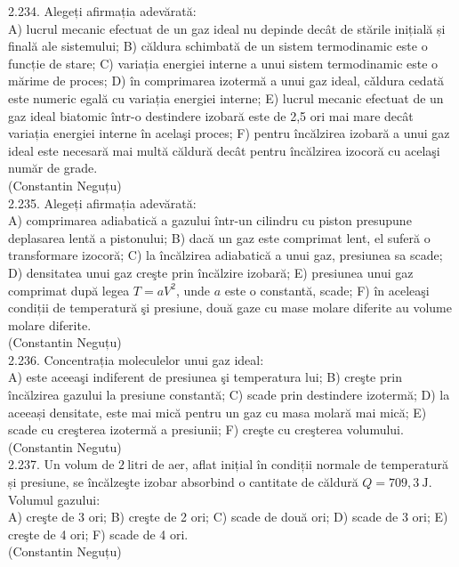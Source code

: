 \documentclass[10pt]{article}
\begin{document}
2.234. Alegeți afirmația adevărată:\\ A) lucrul mecanic efectuat de un gaz ideal nu depinde decât de stările inițială și finală ale sistemului; B) căldura schimbată de un sistem termodinamic este o funcție de stare; C) variația energiei interne a unui sistem termodinamic este o mărime de proces; D) în comprimarea izotermă a unui gaz ideal, cǎldura cedată este numeric egală cu variația energiei interne; E) lucrul mecanic efectuat de un gaz ideal biatomic într-o destindere izobară este de 2,5 ori mai mare decât variația energiei interne în acelaşi proces; F) pentru încălzirea izobară a unui gaz ideal este necesară mai multă căldură decât pentru încălzirea izocoră cu acelaşi număr de grade.\\ (Constantin Neguțu)\\

2.235. Alegeți afirmația adevărată:\\ A) comprimarea adiabatică a gazului într-un cilindru cu piston presupune deplasarea lentă a pistonului; B) dacă un gaz este comprimat lent, el suferă o transformare izocoră; C) la încălzirea adiabatică a unui gaz, presiunea sa scade; D) densitatea unui gaz creşte prin încălzire izobară; E) presiunea unui gaz comprimat după legea $T=a V^{2}$, unde $a$ este o constantă, scade; F) în aceleaşi condiții de temperatură şi presiune, două gaze cu mase molare diferite au volume molare diferite.\\ (Constantin Neguțu)\\

2.236. Concentrația moleculelor unui gaz ideal:\\ A) este aceeaşi indiferent de presiunea şi temperatura lui; B) creşte prin încălzirea gazului la presiune constantă; C) scade prin destindere izotermă; D) la aceeași densitate, este mai mică pentru un gaz cu masa molară mai mică; E) scade cu creşterea izotermă a presiunii; F) creşte cu creşterea volumului.\\ (Constantin Negutu)\\

2.237. Un volum de $2 \mathrm{~litri}$ de aer, aflat inițial în condiții normale de temperatură și presiune, se încălzeşte izobar absorbind o cantitate de căldură $Q=709,3 \mathrm{~J}$. Volumul gazului:\\ A) creşte de 3 ori; B) creşte de 2 ori; C) scade de două ori; D) scade de 3 ori; E) creşte de 4 ori; F) scade de 4 ori.\\ (Constantin Neguțu)\\
\end{document}
